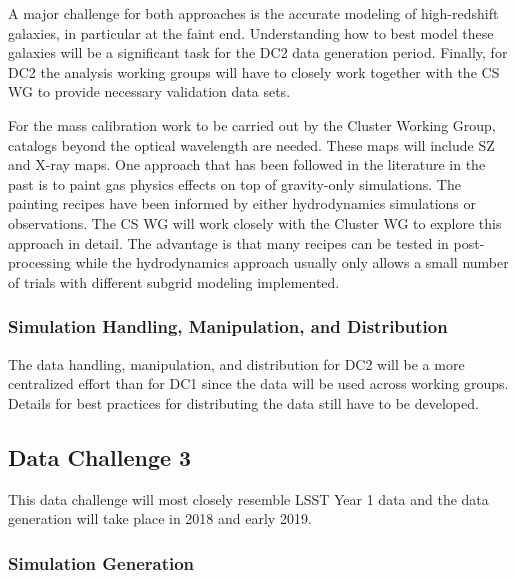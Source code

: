 A major challenge for both approaches is the accurate modeling of high-redshift galaxies, in particular at the faint end. Understanding how to best model these galaxies will be a significant task for the DC2 data generation period. 
Finally, for DC2 the analysis working groups will have to closely work together with the CS WG to provide necessary validation data sets.

For the mass calibration work to be carried out by the Cluster Working Group, catalogs beyond the optical wavelength are needed. These maps will include SZ and X-ray maps. One approach that has been followed in the literature in the past is to paint gas physics effects on top of gravity-only simulations. The painting recipes have been informed by either hydrodynamics simulations or observations. The CS WG will work closely with the Cluster WG to explore this approach in detail. The advantage is that many recipes can be tested in post-processing while the hydrodynamics approach usually only allows a small number of trials with different subgrid modeling implemented.


\subsubsection{Simulation Handling, Manipulation, and Distribution}
\label{sec:keysims:dc2:handling}

The data handling, manipulation, and distribution for DC2 will be a more centralized effort than for DC1 since the data will be used across working groups. Details for best practices for distributing the data still have to be developed.  


\subsection{Data Challenge 3}
\label{sec:keysims:dc3}

This data challenge will most closely resemble LSST Year 1 data and the data generation will take place in 2018 and early 2019.

\subsubsection{Simulation Generation}
\label{sec:keysims:dc3:simgen}

